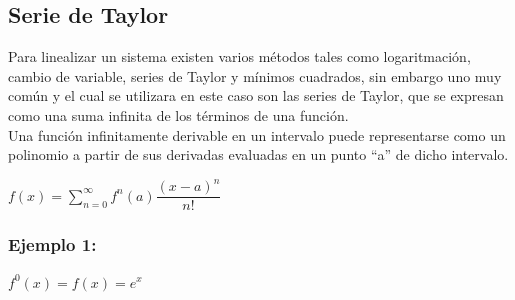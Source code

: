\documentclass[a4paper,12pt,twoside]{proyectotanquesecci}
\begin{document}
\subsection{Serie de Taylor}

Para linealizar un sistema existen varios métodos tales como logaritmación, cambio de variable, series de Taylor y mínimos cuadrados, sin embargo uno muy común y el cual se utilizara en este caso son las series de Taylor, que se expresan como una suma infinita de los términos de una función.\\

Una función infinitamente derivable en un intervalo puede representarse como un polinomio a partir de sus derivadas evaluadas en un punto “a” de dicho intervalo.

\begin{center}
	$f\left( x\right) =\sum ^{\infty }_{n=0}f^{n}\left( a\right) \dfrac {\left( x-a\right) ^{n}}{n!}$
\end{center}

\subsubsection{Ejemplo 1:}

\begin{center}
	$f^{0}\left( x\right) =f\left( x\right) =e^{x}$
\end{center}
\end{document}
